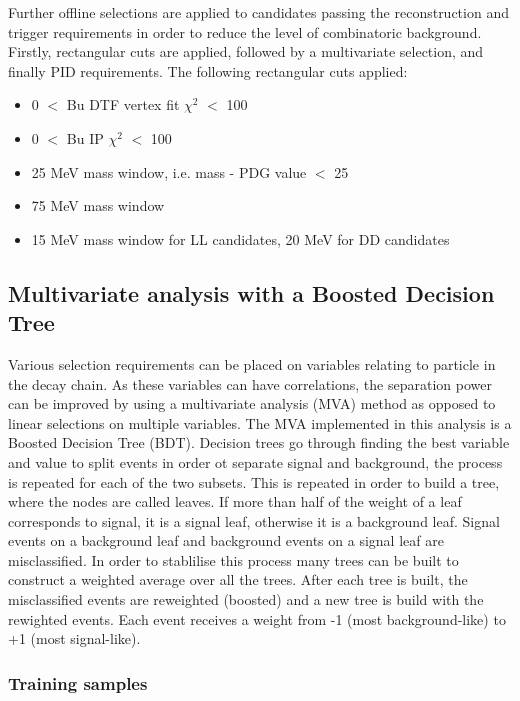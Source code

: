 Further offline selections are applied to candidates passing the reconstruction and trigger requirements in order to reduce the level of combinatoric background. Firstly, rectangular cuts are applied, followed by a multivariate selection, and finally PID requirements. The following rectangular cuts applied:

\begin{itemize}
\item 0 $<$ Bu DTF vertex fit $\chi^2$ $<$ 100
\item 0 $<$ Bu IP $\chi^2$ $<$ 100
\item 25 MeV \Dz mass window, i.e. \textbar \Dz mass - PDG value \textbar $<$ 25 \mev
\item 75 MeV \Kstarm mass window
\item 15 MeV \KS mass window for LL candidates, 20 MeV for DD candidates
\end{itemize}

\subsection{Multivariate analysis with a Boosted Decision Tree}
\label{sec:selection:bdt}

Various selection requirements can be placed on variables relating to particle in the decay chain. As these variables can have correlations, the separation power can be improved by using a multivariate analysis (MVA) method as opposed to linear selections on multiple variables. The MVA implemented in this analysis is a Boosted Decision Tree (BDT). Decision trees go through finding the best variable and value to split events in order ot separate signal and background, the process is repeated for each of the two subsets. This is repeated in order to build a tree, where the nodes are called leaves. If more than half of the weight of a leaf corresponds to signal, it is a signal leaf, otherwise it is a background leaf. Signal events on a background leaf and background events on a signal leaf are misclassified. In order to stablilise this process many trees can be built to construct a weighted average over all the trees. After each tree is built, the misclassified events are reweighted (boosted) and a new tree is build with the rewighted events. Each event receives a weight from -1 (most background-like) to +1 (most signal-like). 

\subsubsection{Training samples}

